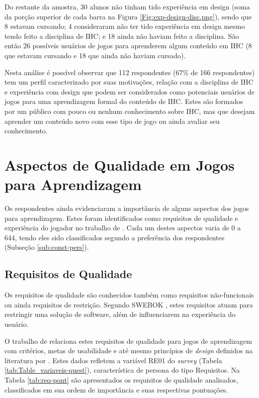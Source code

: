 Do restante da amostra, 30 alunos não tinham tido experiência em design (soma da porção superior de cada barra na Figura \ref{Fig:exp-design-disc.png}), sendo que 8 estavam cursando; 4 consideraram não ter tido experiência em design mesmo tendo feito a disciplina de IHC; e 18 ainda não haviam feito a disciplina. São então 26 possíveis usuários de jogos para aprenderem algum conteúdo em IHC (8 que estavam cursando e 18 que ainda não haviam cursado).

Nesta análise é possível observar que 112 respondentes (67\% de 166 respondentes) tem um perfil caracterizado por suas motivações, relação com a disciplina de IHC e experiência com design que podem ser considerados como potenciais usuários de jogos para uma aprendizagem formal do conteúdo de IHC. Estes são formados por um público com pouco ou nenhum conhecimento sobre IHC, mas que desejam aprender um conteúdo novo com esse tipo de jogo ou ainda avaliar seu conhecimento. 

\section{Aspectos de Qualidade em Jogos para Aprendizagem}
\label{sec:aspec}
Os respondentes ainda evidenciaram a importância de alguns aspectos dos jogos para aprendizagem. Estes foram identificados como requisitos de qualidade e experiência do jogador no trabalho de \cite{silva_sales_mendes2021}. Cada um destes aspectos varia de 0 a 644, tendo eles sido classificados segundo a preferência dos respondentes (Subseção \ref{sub:const-pers}). 

\subsection{Requisitos de Qualidade}
Os requisitos de qualidade são conhecidos também como requisitos não-funcionais ou ainda requisitos de restrição. Segundo SWEBOK \cite{swebok2014}, estes requisitos atuam para restringir uma solução de software, além de influenciarem na experiência do usuário. 

O trabalho de  relaciona estes requisitos de qualidade para jogos de aprendizagem com critérios, metas de usabilidade e até mesmo princípios de \textit{design} definidos na literatura por . Estes dados refletem a variável RE01 do \textit{survey} (Tabela \ref{tab:Table_variaveis-quest}), característica de persona do tipo Requisitos. Na Tabela \ref{tab:req-pont} são apresentados os requisitos de qualidade analisados, classificados em sua ordem de importância e suas respectivas pontuações.

